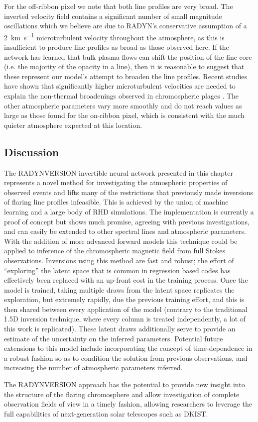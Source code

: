 For the off-ribbon pixel we note that both line profiles are very broad.
The inverted velocity field contains a significant number of small magnitude oscillations which we believe are due to RADYN's conservative assumption of a \SI{2}{\kilo\metre\per\second} microturbulent velocity throughout the atmosphere, as this is insufficient to produce line profiles as broad as those observed here.
If the network has learned that bulk plasma flows can shift the position of the line core (i.e. the majority of the opacity in a line), then it is reasonable to suggest that these represent our model's attempt to broaden the line profiles.
Recent studies have shown that significantly higher microturbulent velocities are needed to explain the non-thermal broadenings observed in chromospheric plages \citep[\SIrange{6}{7}{\kilo\metre\per\second};][]{2015Carlsson}.
The other atmospheric parameters vary more smoothly and do not reach values as large as those found for the on-ribbon pixel, which is consistent with the much quieter atmosphere expected at this location.

\subsection{Discussion}

The RADYNVERSION invertible neural network presented in this chapter represents a novel method for investigating the atmospheric properties of observed events and lifts many of the restrictions that previously made inversions of flaring line profiles infeasible.
This is achieved by the union of machine learning and a large body of RHD simulations.
The implementation is currently a proof of concept but shows much promise, agreeing with previous investigations, and can easily be extended to other spectral lines and atmospheric parameters.
With the addition of more advanced forward models this technique could be applied to inference of the chromospheric magnetic field from full Stokes observations.
Inversions using this method are fast and robust; the effort of ``exploring'' the latent space that is common in regression based codes has effectively been replaced with an up-front cost in the training process.
Once the model is trained, taking multiple draws from the latent space replicates the exploration, but extremely rapidly, due the previous training effort, and this is then shared between every application of the model (contrary to the traditional 1.5D inversion technique, where every column is treated independently, a lot of this work is replicated).
These latent draws additionally serve to provide an estimate of the uncertainty on the inferred parameters.
Potential future extensions to this model include incorporating the concept of time-dependence in a robust fashion so as to condition the solution from previous observations, and increasing the number of atmospheric parameters inferred.

The RADYNVERSION approach has the potential to provide new insight into the structure of the flaring chromosphere and allow investigation of complete observation fields of view in a timely fashion, allowing researchers to leverage the full capabilities of next-generation solar telescopes such as DKIST.

